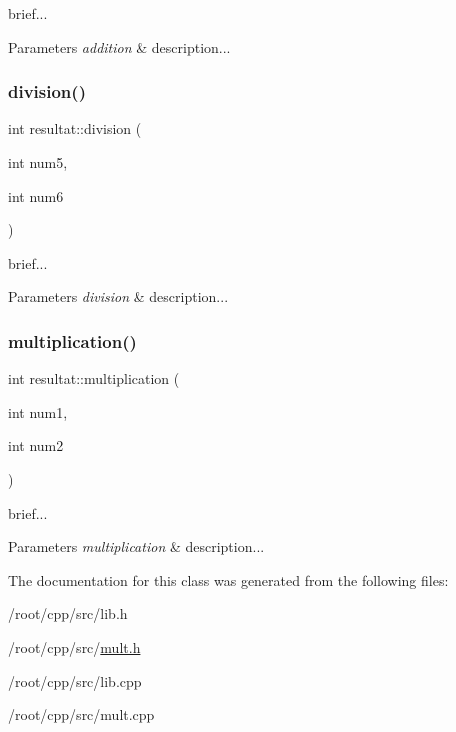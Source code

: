 brief... 
\begin{DoxyParams}{Parameters}
{\em addition} & description... \\
\hline
\end{DoxyParams}
\mbox{\label{classresultat_ab1dfe27df49fb99860cc7cbf03ad19d9}} 
\subsubsection{\texorpdfstring{division()}{division()}}
{\footnotesize\ttfamily int resultat\+::division (\begin{DoxyParamCaption}\item[{int}]{num5,  }\item[{int}]{num6 }\end{DoxyParamCaption})}

brief... 
\begin{DoxyParams}{Parameters}
{\em division} & description... \\
\hline
\end{DoxyParams}
\mbox{\label{classresultat_ac3f4984d7c159106135e1af82c9e4556}} 
\subsubsection{\texorpdfstring{multiplication()}{multiplication()}}
{\footnotesize\ttfamily int resultat\+::multiplication (\begin{DoxyParamCaption}\item[{int}]{num1,  }\item[{int}]{num2 }\end{DoxyParamCaption})}

brief... 
\begin{DoxyParams}{Parameters}
{\em multiplication} & description... \\
\hline
\end{DoxyParams}


The documentation for this class was generated from the following files\+:\begin{DoxyCompactItemize}
\item 
/root/cpp/src/lib.\+h\item 
/root/cpp/src/\hyperlink{mult_8h}{mult.\+h}\item 
/root/cpp/src/lib.\+cpp\item 
/root/cpp/src/mult.\+cpp\end{DoxyCompactItemize}
